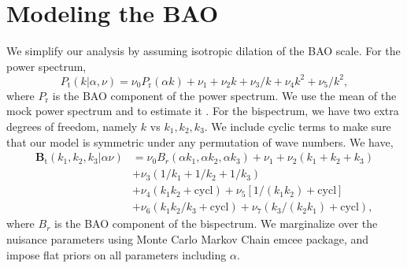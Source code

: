\section{Modeling the BAO}
We simplify our analysis by assuming isotropic dilation of the BAO scale. For the power spectrum,
\begin{equation}
    P_\mathrm{t}(k|\alpha,\nu) = \nu_{0} P_\mathrm{r}(\alpha k) + \nu_{1} + \nu_{2}k + \nu_{3}/k + \nu_{4}k^{2} + \nu_{5}/k^{2},
\end{equation}
where $P_\mathrm{r}$ is the BAO component of the power spectrum. We use the mean of the mock power spectrum and  to estimate it \citep{behera2013}.  For the bispectrum, we have two extra degrees of freedom, namely $k$ vs $k_{1}, k_{2}, k_{3}$. We include cyclic terms to make sure that our model is symmetric under any permutation of wave numbers. We have,
\begin{align}
    \mathbf{B}_\mathrm{t}(k_{1}, k_{2}, k_{3}|\alpha \nu) &= \nu_{0}B_{r}(\alpha k_{1}, \alpha k_{2}, \alpha k_{3}) + \nu_{1} + \nu_{2}(k_{1}+k_{2}+k_{3})\nonumber\\
    &+ \nu_{3}(1/k_{1}+1/k_{2}+1/k_{3})\nonumber\\
    &+\nu_{4}(k_{1}k_{2}+ \text{cycl})+\nu_{5}[1/(k_{1}k_{2})+ \text{cycl}]\nonumber\\
    &+\nu_{6}(k_{1}k_{2}/k_{3}+\text{cycl})+\nu_{7}(k_{3}/(k_{2}k_{1})+\text{cycl}),
\end{align}
where $B_{r}$ is the BAO component of the bispectrum. We marginalize over the nuisance parameters using Monte Carlo Markov Chain emcee package, and impose flat priors on all parameters including $\alpha$.